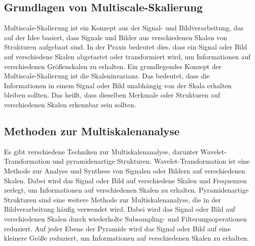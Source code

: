     \subsection{Grundlagen von Multiscale-Skalierung}
    
        Multiscale-Skalierung ist ein Konzept aus der Signal- und Bildverarbeitung, das auf der Idee basiert, dass Signale und Bilder aus verschiedenen Skalen von Strukturen aufgebaut sind.
        In der Praxis bedeutet dies, dass ein Signal oder Bild auf verschiedene Skalen abgetastet oder transformiert wird, um Informationen auf verschiedenen Größenskalen zu erhalten.
        Ein grundlegendes Konzept der Multiscale-Skalierung ist die Skaleninvarianz.      
        Das bedeutet, dass die Informationen in einem Signal oder Bild unabhängig von der Skala erhalten bleiben sollten.      
        Das heißt, dass dieselben Merkmale oder Strukturen auf verschiedenen Skalen erkennbar sein sollten.
    
    \subsection{Methoden zur Multiskalenanalyse}
    
        Es gibt verschiedene Techniken zur Multiskalenanalyse, darunter Wavelet-Transformation und pyramidenartige Strukturen.      
        Wavelet-Transformation ist eine Methode zur Analyse und Synthese von Signalen oder Bildern auf verschiedenen Skalen.      
        Dabei wird das Signal oder Bild auf verschiedene Skalen und Frequenzen zerlegt, um Informationen auf verschiedenen Skalen zu erhalten.
        Pyramidenartige Strukturen sind eine weitere Methode zur Multiskalenanalyse, die in der Bildverarbeitung häufig verwendet wird.      
        Dabei wird das Signal oder Bild auf verschiedenen Skalen durch wiederholte Subsampling- und Filterungsoperationen reduziert.      
        Auf jeder Ebene der Pyramide wird das Signal oder Bild auf eine kleinere Größe reduziert, um Informationen auf verschiedenen Skalen zu erhalten.
    
